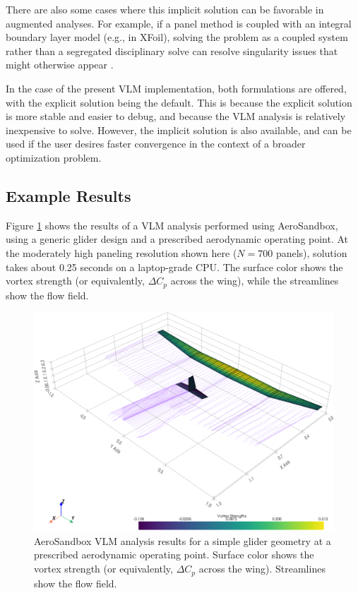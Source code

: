 There are also some cases where this implicit solution can be favorable in augmented analyses. For example, if a panel method is coupled with an integral boundary layer model (e.g., in XFoil), solving the problem as a coupled system rather than a segregated disciplinary solve can resolve singularity issues that might otherwise appear \cite{drela_xfoil_1989, drela_viscousinviscid_1987, ranneberg_viiflow_2019, fidkowski_coupled_2022, zhang_threedimensional_2022}.

In the case of the present VLM implementation, both formulations are offered, with the explicit solution being the default. This is because the explicit solution is more stable and easier to debug, and because the VLM analysis is relatively inexpensive to solve. However, the implicit solution is also available, and can be used if the user desires faster convergence in the context of a broader optimization problem.

\subsection{Example Results}

Figure \ref{fig:vlm} shows the results of a VLM analysis performed using AeroSandbox, using a generic glider design and a prescribed aerodynamic operating point. At the moderately high paneling resolution shown here ($N=700$ panels), solution takes about 0.25 seconds on a laptop-grade CPU. The surface color shows the vortex strength (or equivalently, $\Delta C_p$ across the wing), while the streamlines show the flow field.

\begin{figure}[H]
    \centering
    \includegraphics[width=\textwidth]{../figures/vlm.png}
    \caption{AeroSandbox VLM analysis results for a simple glider geometry at a prescribed aerodynamic operating point. Surface color shows the vortex strength (or equivalently, $\Delta C_p$ across the wing). Streamlines show the flow field.}
    \label{fig:vlm}
\end{figure}

